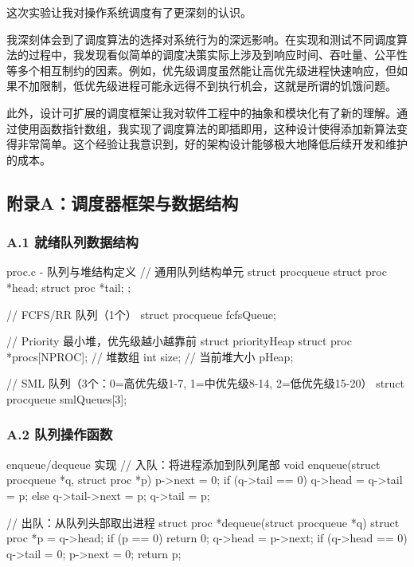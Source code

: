 \documentclass[a4paper, 12pt]{article}
\begin{document}
    这次实验让我对操作系统调度有了更深刻的认识。
    
    我深刻体会到了调度算法的选择对系统行为的深远影响。在实现和测试不同调度算法的过程中，我发现看似简单的调度决策实际上涉及到响应时间、吞吐量、公平性等多个相互制约的因素。例如，优先级调度虽然能让高优先级进程快速响应，但如果不加限制，低优先级进程可能永远得不到执行机会，这就是所谓的饥饿问题。
    
    此外，设计可扩展的调度框架让我对软件工程中的抽象和模块化有了新的理解。通过使用函数指针数组，我实现了调度算法的即插即用，这种设计使得添加新算法变得非常简单。这个经验让我意识到，好的架构设计能够极大地降低后续开发和维护的成本。
   
    
    \newpage
    \subsection{附录A：调度器框架与数据结构}
    
    \subsubsection{A.1 就绪队列数据结构}
    
    \begin{codeblock}{proc.c - 队列与堆结构定义}
// 通用队列结构单元
struct procqueue {
    struct proc *head;
    struct proc *tail;
};

// FCFS/RR 队列（1个）
struct procqueue fcfsQueue;

// Priority 最小堆，优先级越小越靠前
struct priorityHeap {
    struct proc *procs[NPROC]; // 堆数组
    int size;                  // 当前堆大小
} pHeap;

// SML 队列（3个：0=高优先级1-7, 1=中优先级8-14, 2=低优先级15-20）
struct procqueue smlQueues[3];
    \end{codeblock}
    
    \subsubsection{A.2 队列操作函数}
    
    \begin{codeblock}{enqueue/dequeue 实现}
// 入队：将进程添加到队列尾部
void enqueue(struct procqueue *q, struct proc *p) {
    p->next = 0;
    if (q->tail == 0) {
        q->head = q->tail = p;
    } else {
        q->tail->next = p;
        q->tail = p;
    }
}

// 出队：从队列头部取出进程
struct proc *dequeue(struct procqueue *q) {
    struct proc *p = q->head;
    if (p == 0) return 0;
    q->head = p->next;
    if (q->head == 0) {
        q->tail = 0;
    }
    p->next = 0;
    return p;
}
    \end{codeblock}
    
\end{document}
